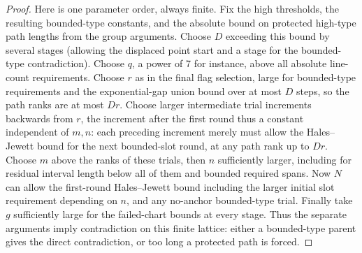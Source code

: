 \begin{proof}
Here is one parameter order, always finite. Fix the high thresholds, the resulting bounded-type constants, and the absolute bound on protected high-type path lengths from the group arguments. Choose \(D\) exceeding this bound by several stages (allowing the displaced point start and a stage for the bounded-type contradiction). Choose \(q\), a power of 7 for instance, above all absolute line-count requirements. Choose \(r\) as in the final flag selection, large for bounded-type requirements and the exponential-gap union bound over at most \(D\) steps, so the path ranks are at most \(Dr\). Choose larger intermediate trial increments backwards from \(r\), the increment after the first round thus a constant independent of \(m,n\): each preceding increment merely must allow the Hales--Jewett bound for the next bounded-slot round, at any path rank up to \(Dr\). Choose \(m\) above the ranks of these trials, then \(n\) sufficiently larger, including for residual interval length below all of them and bounded required spans. Now \(N\) can allow the first-round Hales--Jewett bound including the larger initial slot requirement depending on \(n\), and any no-anchor bounded-type trial. Finally take \(g\) sufficiently large for the failed-chart bounds at every stage. Thus the separate arguments imply contradiction on this finite lattice: either a bounded-type parent gives the direct contradiction, or too long a protected path is forced.
\end{proof}
